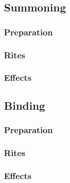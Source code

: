 %
\subsection*{Summoning}
\subsubsection*{Preparation}
\subsubsection*{Rites}
\subsubsection*{Effects}

\subsection*{Binding}
\subsubsection*{Preparation}
\subsubsection*{Rites}
\subsubsection*{Effects}

